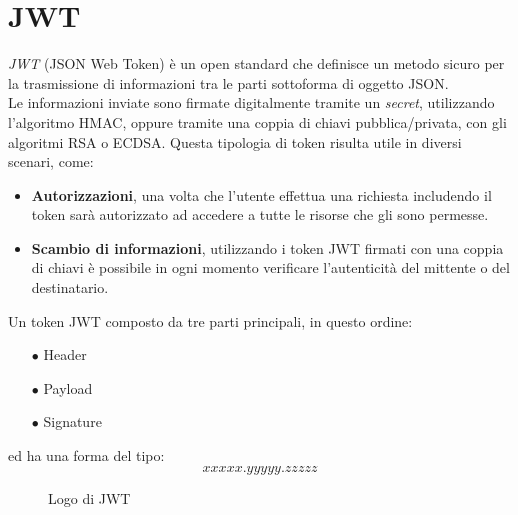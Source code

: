 \section{JWT}\label{sec:jwt}
\emph{JWT} (JSON Web Token) è un open standard che definisce un metodo sicuro per la trasmissione di informazioni tra le parti sottoforma di oggetto JSON.\\
Le informazioni inviate sono firmate digitalmente tramite un \emph{secret}, utilizzando l’algoritmo HMAC, oppure tramite una coppia di chiavi pubblica/privata, con gli algoritmi RSA o ECDSA.
Questa tipologia di token risulta utile in diversi scenari, come:
\begin{itemize}
	\item \textbf{Autorizzazioni}, una volta che l’utente effettua una richiesta includendo il token sarà autorizzato ad accedere a tutte le risorse che gli sono permesse.
	\item \textbf{Scambio di informazioni}, utilizzando i token JWT firmati con una coppia di chiavi è possibile in ogni momento verificare l’autenticità del mittente o del destinatario.
\end{itemize}

Un token JWT composto da tre parti principali, in questo ordine:
\begin{itemize}
	\item[$\bullet$]Header
	\item[$\bullet$]Payload
	\item[$\bullet$]Signature
\end{itemize}
ed ha una forma del tipo:
\[ xxxxx.yyyyy.zzzzz \]
\begin{figure}[h]
	\centering
	\caption{Logo di JWT}
	\label{fig:one}
\end{figure}


